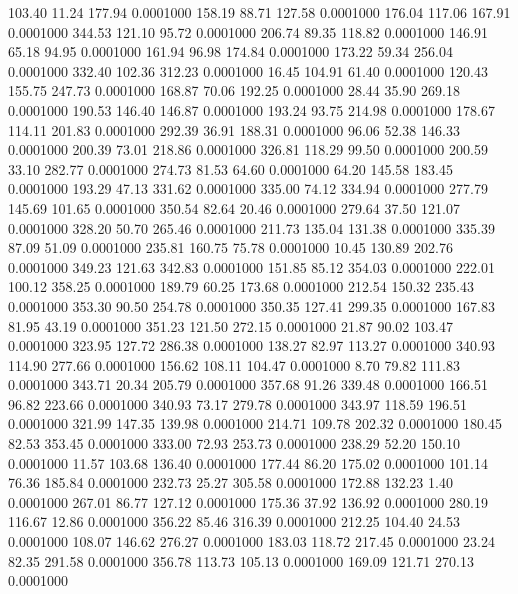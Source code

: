  103.40   11.24  177.94   0.0001000
 158.19   88.71  127.58   0.0001000
 176.04  117.06  167.91   0.0001000
 344.53  121.10   95.72   0.0001000
 206.74   89.35  118.82   0.0001000
 146.91   65.18   94.95   0.0001000
 161.94   96.98  174.84   0.0001000
 173.22   59.34  256.04   0.0001000
 332.40  102.36  312.23   0.0001000
  16.45  104.91   61.40   0.0001000
 120.43  155.75  247.73   0.0001000
 168.87   70.06  192.25   0.0001000
  28.44   35.90  269.18   0.0001000
 190.53  146.40  146.87   0.0001000
 193.24   93.75  214.98   0.0001000
 178.67  114.11  201.83   0.0001000
 292.39   36.91  188.31   0.0001000
  96.06   52.38  146.33   0.0001000
 200.39   73.01  218.86   0.0001000
 326.81  118.29   99.50   0.0001000
 200.59   33.10  282.77   0.0001000
 274.73   81.53   64.60   0.0001000
  64.20  145.58  183.45   0.0001000
 193.29   47.13  331.62   0.0001000
 335.00   74.12  334.94   0.0001000
 277.79  145.69  101.65   0.0001000
 350.54   82.64   20.46   0.0001000
 279.64   37.50  121.07   0.0001000
 328.20   50.70  265.46   0.0001000
 211.73  135.04  131.38   0.0001000
 335.39   87.09   51.09   0.0001000
 235.81  160.75   75.78   0.0001000
  10.45  130.89  202.76   0.0001000
 349.23  121.63  342.83   0.0001000
 151.85   85.12  354.03   0.0001000
 222.01  100.12  358.25   0.0001000
 189.79   60.25  173.68   0.0001000
 212.54  150.32  235.43   0.0001000
 353.30   90.50  254.78   0.0001000
 350.35  127.41  299.35   0.0001000
 167.83   81.95   43.19   0.0001000
 351.23  121.50  272.15   0.0001000
  21.87   90.02  103.47   0.0001000
 323.95  127.72  286.38   0.0001000
 138.27   82.97  113.27   0.0001000
 340.93  114.90  277.66   0.0001000
 156.62  108.11  104.47   0.0001000
   8.70   79.82  111.83   0.0001000
 343.71   20.34  205.79   0.0001000
 357.68   91.26  339.48   0.0001000
 166.51   96.82  223.66   0.0001000
 340.93   73.17  279.78   0.0001000
 343.97  118.59  196.51   0.0001000
 321.99  147.35  139.98   0.0001000
 214.71  109.78  202.32   0.0001000
 180.45   82.53  353.45   0.0001000
 333.00   72.93  253.73   0.0001000
 238.29   52.20  150.10   0.0001000
  11.57  103.68  136.40   0.0001000
 177.44   86.20  175.02   0.0001000
 101.14   76.36  185.84   0.0001000
 232.73   25.27  305.58   0.0001000
 172.88  132.23    1.40   0.0001000
 267.01   86.77  127.12   0.0001000
 175.36   37.92  136.92   0.0001000
 280.19  116.67   12.86   0.0001000
 356.22   85.46  316.39   0.0001000
 212.25  104.40   24.53   0.0001000
 108.07  146.62  276.27   0.0001000
 183.03  118.72  217.45   0.0001000
  23.24   82.35  291.58   0.0001000
 356.78  113.73  105.13   0.0001000
 169.09  121.71  270.13   0.0001000
